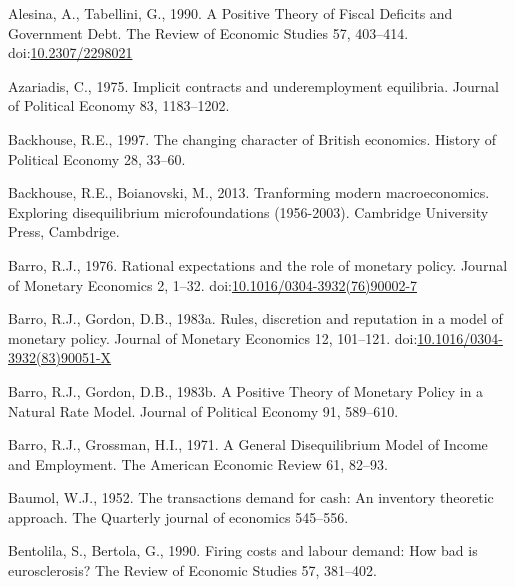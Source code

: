 \documentclass[
  12pt,
  onecolumn]{article}
\newlength{\cslhangindent}
\newlength{\cslentryspacingunit} %
\newenvironment{CSLReferences}[2] %
 {%
  \setlength{\parindent}{0pt}
  \ifodd #1
  \let\oldpar\par
  \def\par{\hangindent=\cslhangindent\oldpar}
  \fi
  \setlength{\parskip}{#2\cslentryspacingunit}
 }%
 {}
\begin{document}
\hypertarget{refs}{}
\begin{CSLReferences}{1}{0}
\leavevmode{}%
Alesina, A., Tabellini, G., 1990. A {Positive Theory} of {Fiscal
Deficits} and {Government Debt}. The Review of Economic Studies 57,
403--414. doi:\href{https://doi.org/10.2307/2298021}{10.2307/2298021}

\leavevmode{}%
Azariadis, C., 1975. Implicit contracts and underemployment equilibria.
Journal of Political Economy 83, 1183--1202.

\leavevmode{}%
Backhouse, R.E., 1997. The changing character of {British} economics.
History of Political Economy 28, 33--60.

\leavevmode{}%
Backhouse, R.E., Boianovski, M., 2013. Tranforming modern
macroeconomics. {Exploring} disequilibrium microfoundations (1956-2003).
{Cambridge University Press}, {Cambdrige}.

\leavevmode{}%
Barro, R.J., 1976. Rational expectations and the role of monetary
policy. Journal of Monetary Economics 2, 1--32.
doi:\href{https://doi.org/10.1016/0304-3932(76)90002-7}{10.1016/0304-3932(76)90002-7}

\leavevmode{}%
Barro, R.J., Gordon, D.B., 1983a. Rules, discretion and reputation in a
model of monetary policy. Journal of Monetary Economics 12, 101--121.
doi:\href{https://doi.org/10.1016/0304-3932(83)90051-X}{10.1016/0304-3932(83)90051-X}

\leavevmode{}%
Barro, R.J., Gordon, D.B., 1983b. A {Positive Theory} of {Monetary
Policy} in a {Natural Rate Model}. Journal of Political Economy 91,
589--610.

\leavevmode{}%
Barro, R.J., Grossman, H.I., 1971. A {General Disequilibrium Model} of
{Income} and {Employment}. The American Economic Review 61, 82--93.

\leavevmode{}%
Baumol, W.J., 1952. The transactions demand for cash: {An} inventory
theoretic approach. The Quarterly journal of economics 545--556.

\leavevmode{}%
Bentolila, S., Bertola, G., 1990. Firing costs and labour demand: How
bad is eurosclerosis? The Review of Economic Studies 57, 381--402.


\end{CSLReferences}
\end{document}
